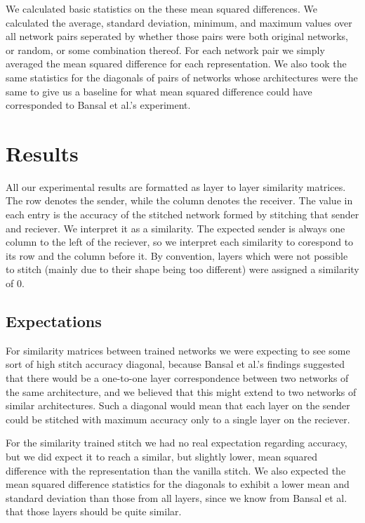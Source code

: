 \documentclass{article} %
\begin{document}
We calculated basic statistics on the these mean squared differences. We calculated the average, standard deviation, minimum,
and maximum values over all network pairs seperated by whether those pairs were both original networks, or random, or some
combination thereof. For each network pair we simply averaged the mean squared difference for each representation.
We also took the same statistics for the diagonals of pairs of networks whose architectures were the
same to give us a baseline for what mean squared difference could have corresponded to Bansal et al.'s
experiment.

\section{Results}
\label{Results}
All our experimental results are formatted as layer to
layer similarity matrices. The row denotes the sender, while the column denotes the receiver.
The value in each entry is the accuracy of the stitched network formed by stitching that sender
and reciever. We interpret it as a similarity.
The expected sender is always one column to the left of the reciever, so we interpret each similarity
to corespond to its row and the column before it. By convention, layers which were not possible to stitch
(mainly due to their shape being too different) were assigned a similarity of 0.

\subsection*{Expectations}
For similarity matrices between trained networks we were expecting to see some sort of high stitch accuracy diagonal, because
Bansal et al.'s findings suggested that there would be a one-to-one layer correspondence between
two networks of the same architecture, and we believed that this might extend to two networks of similar architectures.
Such a diagonal would mean that each layer on the sender could be stitched with maximum accuracy 
only to a single layer on the reciever.

For the similarity trained stitch we had no real expectation regarding accuracy, but we did expect it to reach a similar, but
slightly lower, mean squared difference with the representation than the vanilla stitch. We also expected the mean squared
difference statistics for the diagonals to exhibit a lower mean and standard deviation than those from all layers, 
since we know from Bansal et al. that
those layers should be quite similar.
\end{document}
